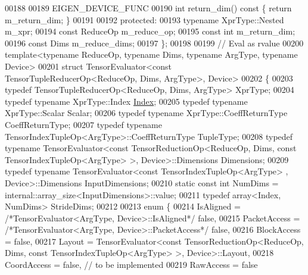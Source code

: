 \begin{DoxyCode}
00188 
00189   EIGEN\_DEVICE\_FUNC
00190   \textcolor{keywordtype}{int} return\_dim()\textcolor{keyword}{ const }\{ \textcolor{keywordflow}{return} m\_return\_dim; \}
00191 
00192   \textcolor{keyword}{protected}:
00193     \textcolor{keyword}{typename} XprType::Nested m\_xpr;
00194     \textcolor{keyword}{const} ReduceOp m\_reduce\_op;
00195     \textcolor{keyword}{const} \textcolor{keywordtype}{int} m\_return\_dim;
00196     \textcolor{keyword}{const} Dims m\_reduce\_dims;
00197 \};
00198 
00199 \textcolor{comment}{// Eval as rvalue}
00200 \textcolor{keyword}{template}<\textcolor{keyword}{typename} ReduceOp, \textcolor{keyword}{typename} Dims, \textcolor{keyword}{typename} ArgType, \textcolor{keyword}{typename} Device>
00201 \textcolor{keyword}{struct }TensorEvaluator<const TensorTupleReducerOp<ReduceOp, Dims, ArgType>, Device>
00202 \{
00203   \textcolor{keyword}{typedef} TensorTupleReducerOp<ReduceOp, Dims, ArgType> XprType;
00204   \textcolor{keyword}{typedef} \textcolor{keyword}{typename} XprType::Index \hyperlink{namespace_eigen_a62e77e0933482dafde8fe197d9a2cfde}{Index};
00205   \textcolor{keyword}{typedef} \textcolor{keyword}{typename} XprType::Scalar Scalar;
00206   \textcolor{keyword}{typedef} \textcolor{keyword}{typename} XprType::CoeffReturnType CoeffReturnType;
00207   \textcolor{keyword}{typedef} \textcolor{keyword}{typename} TensorIndexTupleOp<ArgType>::CoeffReturnType TupleType;
00208   \textcolor{keyword}{typedef} \textcolor{keyword}{typename} TensorEvaluator<const TensorReductionOp<ReduceOp, Dims, const
       TensorIndexTupleOp<ArgType> >, Device>::Dimensions Dimensions;
00209   \textcolor{keyword}{typedef} \textcolor{keyword}{typename} TensorEvaluator<const TensorIndexTupleOp<ArgType> , Device>::Dimensions InputDimensions;
00210   \textcolor{keyword}{static} \textcolor{keyword}{const} \textcolor{keywordtype}{int} NumDims = internal::array\_size<InputDimensions>::value;
00211   \textcolor{keyword}{typedef} array<Index, NumDims> StrideDims;
00212 
00213   \textcolor{keyword}{enum} \{
00214     IsAligned = \textcolor{comment}{/*TensorEvaluator<ArgType, Device>::IsAligned*/} \textcolor{keyword}{false},
00215     PacketAccess = \textcolor{comment}{/*TensorEvaluator<ArgType, Device>::PacketAccess*/} \textcolor{keyword}{false},
00216     BlockAccess = \textcolor{keyword}{false},
00217     Layout = TensorEvaluator<const TensorReductionOp<ReduceOp, Dims, const TensorIndexTupleOp<ArgType> >, 
      Device>::Layout,
00218     CoordAccess = \textcolor{keyword}{false},  \textcolor{comment}{// to be implemented}
00219     RawAccess = \textcolor{keyword}{false}

\end{DoxyCode}
